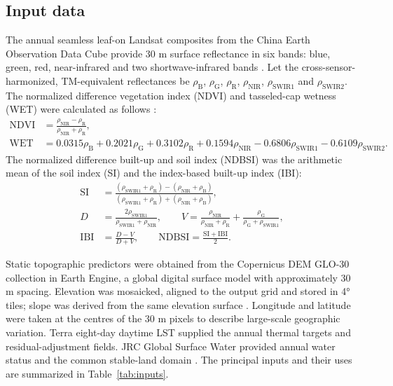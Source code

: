 \subsection{Input data}

The annual seamless leaf-on Landsat composites from the China Earth Observation Data Cube provide 30 m surface reflectance in six bands: blue, green, red, near-infrared and two shortwave-infrared bands \parencite{cai2025ceodc}. Let the cross-sensor-harmonized, TM-equivalent reflectances be $\rho_{\mathrm{B}}$, $\rho_{\mathrm{G}}$, $\rho_{\mathrm{R}}$, $\rho_{\mathrm{NIR}}$, $\rho_{\mathrm{SWIR1}}$ and $\rho_{\mathrm{SWIR2}}$. The normalized difference vegetation index (NDVI) and tasseled-cap wetness (WET) were calculated as follows \parencite{tucker1979ndvi,crist1985tasseled,zha2003ndbi,xu2008ibi}:
\begin{align}
\mathrm{NDVI} & = \frac{\rho_{\mathrm{NIR}}-\rho_{\mathrm{R}}}{\rho_{\mathrm{NIR}}+\rho_{\mathrm{R}}},\\
\mathrm{WET} & = 0.0315\rho_{\mathrm{B}}+0.2021\rho_{\mathrm{G}}+0.3102\rho_{\mathrm{R}}+0.1594\rho_{\mathrm{NIR}}-0.6806\rho_{\mathrm{SWIR1}}-0.6109\rho_{\mathrm{SWIR2}}.
\end{align}
The normalized difference built-up and soil index (NDBSI) was the arithmetic mean of the soil index (SI) and the index-based built-up index (IBI):
\begin{align}
\mathrm{SI} & = \frac{(\rho_{\mathrm{SWIR1}}+\rho_{\mathrm{R}})-(\rho_{\mathrm{NIR}}+\rho_{\mathrm{B}})}{(\rho_{\mathrm{SWIR1}}+\rho_{\mathrm{R}})+(\rho_{\mathrm{NIR}}+\rho_{\mathrm{B}})},\\
D & = \frac{2\rho_{\mathrm{SWIR1}}}{\rho_{\mathrm{SWIR1}}+\rho_{\mathrm{NIR}}},\qquad
V = \frac{\rho_{\mathrm{NIR}}}{\rho_{\mathrm{NIR}}+\rho_{\mathrm{R}}}+\frac{\rho_{\mathrm{G}}}{\rho_{\mathrm{G}}+\rho_{\mathrm{SWIR1}}},\\
\mathrm{IBI} & = \frac{D-V}{D+V},\qquad
\mathrm{NDBSI}=\frac{\mathrm{SI}+\mathrm{IBI}}{2}.
\end{align}

Static topographic predictors were obtained from the Copernicus DEM GLO-30 collection in Earth Engine, a global digital surface model with approximately 30 m spacing. Elevation was mosaicked, aligned to the output grid and stored in 4° tiles; slope was derived from the same elevation surface \parencite{copernicusDem2022}. Longitude and latitude were taken at the centres of the 30 m pixels to describe large-scale geographic variation. Terra eight-day daytime LST supplied the annual thermal targets and residual-adjustment fields. JRC Global Surface Water provided annual water status and the common stable-land domain \parencite{pekel2016water}. The principal inputs and their uses are summarized in Table~\ref*{tab:inputs}.

